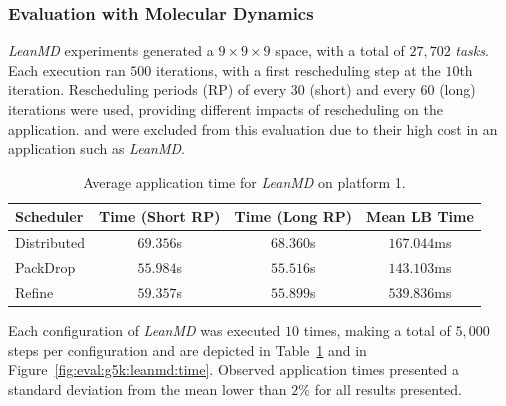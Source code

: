\subsubsection{Evaluation with Molecular Dynamics} \label{sec:cluster:md}

\textit{LeanMD} experiments generated a $9\times9\times9$ space, with a total of $27,702$ \textit{tasks}.
Each execution ran $500$ iterations, with a first rescheduling step at the $10$th iteration. 
Rescheduling periods (RP) of every $30$ (short) and every $60$ (long) iterations were used, providing different impacts of rescheduling on the application.
\greedylb and \dummylb were excluded from this evaluation due to their high cost in an application such as \textit{LeanMD}. 


\begin{table}[!ht]
	\centering
	\caption{Average application time for \textit{LeanMD} on platform 1.}	
	\begin{tabular}{l|c c c}
	Scheduler & Time (Short RP) & Time (Long RP) & Mean LB Time \\ \hline
	Distributed & $69.356$s & $68.360$s & $167.044$ms \\ 
	PackDrop & $55.984$s & $55.516$s & $143.103$ms \\ 
	Refine & $59.357$s & $55.899$s & $539.836$ms \\ 
	\end{tabular}
	\label{tab:eval:g5k:leanmd:time} 
\end{table}




Each configuration of \textit{LeanMD} was executed $10$ times, making a total of $5,000$ steps per configuration and are depicted in Table~\ref{tab:eval:g5k:leanmd:time} and in Figure~\ref{fig:eval:g5k:leanmd:time}.
Observed application times presented a standard deviation from the mean lower than $2\%$ for all results presented.

